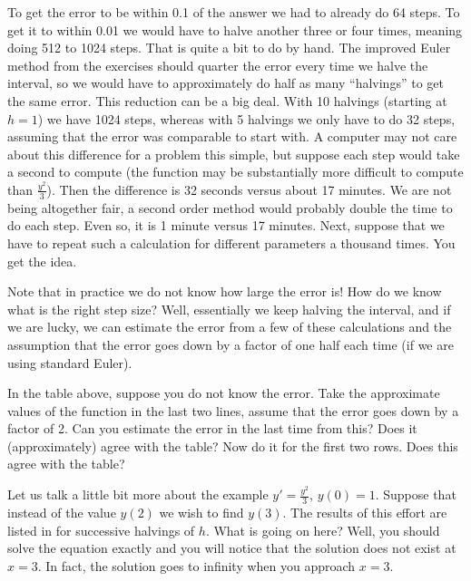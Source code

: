 \documentclass{ximera}
\begin{document}
To get the error to be within 0.1 of the answer we had to already do 64 steps.  To get it to within 0.01 we would have to halve another three or four times, meaning doing 512 to 1024 steps.  That is quite a bit to do by hand.  The improved Euler method from the exercises should quarter the error every time we halve the interval, so we would have to approximately do half as many ``halvings'' to get the same error.  This reduction can be a big deal.  With 10 halvings (starting at $h=1$) we have 1024 steps, whereas with 5 halvings we only have to do 32 steps, assuming that the error was comparable to start with.  A computer may not care about this difference for a problem this simple, but suppose each step would take a second to compute (the function may be substantially more difficult to compute than $\frac{y^2}{3}$).  Then the difference is 32 seconds versus about 17 minutes. We are not being altogether fair, a second order method would probably double the time to do each step.  Even so, it is 1 minute versus 17 minutes. Next, suppose that we have to repeat such a calculation for different parameters a thousand times.  You get the idea.

Note that in practice we do not know how large the error is! How do we know what is the right step size?  Well, essentially we keep halving the interval, and if we are lucky, we can estimate the error from a few of these calculations and the assumption that the error goes down by a factor of one half each time (if we are using standard Euler).

\begin{exercise}
    In the table above, suppose you do not know the error.  Take the approximate values of the function in the last two lines, assume that the error goes down by a factor of 2.  Can you estimate the error in the last time from this?  Does it (approximately) agree with the table?  Now do it for the first two rows.  Does this agree with the table?
\end{exercise}

Let us talk a little bit more about the example $y' = \frac{y^2}{3}$, $y(0) = 1$.  Suppose that instead of the value $y(2)$ we wish to find $y(3)$. The results of this effort are listed in  for successive halvings of $h$.  What is going on here?  Well, you should solve the equation exactly and you will notice that the solution does not exist at $x=3$.  In fact, the solution goes to infinity when you approach $x=3$.
\end{document}
